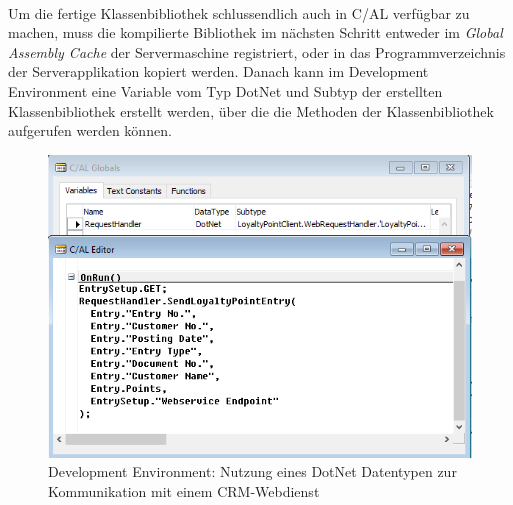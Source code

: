 \paragraph{}

Um die fertige Klassenbibliothek schlussendlich auch in C/AL verfügbar zu machen, muss die kompilierte Bibliothek im nächsten Schritt entweder im \textit{Global Assembly Cache}  der Servermaschine registriert, oder in das Programmverzeichnis der Serverapplikation kopiert werden. Danach kann im Development Environment eine Variable vom Typ DotNet und Subtyp der erstellten Klassenbibliothek erstellt werden, über die die Methoden der Klassenbibliothek aufgerufen werden können.

\begin{figure}[h]
	\centering
	\includegraphics[width=130mm]{images/dotnetVariable}
	\caption{Development Environment: Nutzung eines DotNet Datentypen zur Kommunikation mit einem CRM-Webdienst}
	\label{fig:dotnetVariable}
\end{figure}


